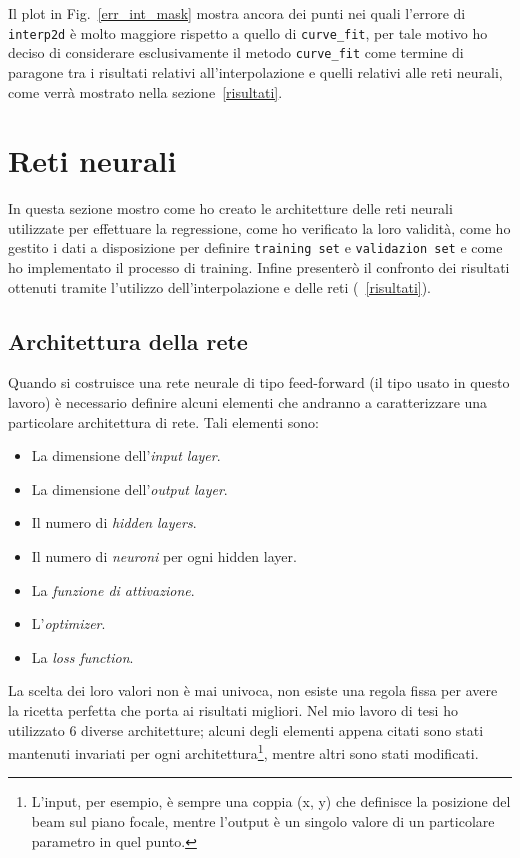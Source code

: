 \documentclass[12pt,a4paper,final]{book}
\begin{document}
Il plot in Fig.~\ref{err_int_mask} mostra ancora dei punti nei quali l'errore di \texttt{interp2d} è molto maggiore rispetto a quello di \texttt{curve\_fit}, per tale motivo ho deciso di considerare esclusivamente il metodo \texttt{curve\_fit} come termine di paragone tra i risultati relativi all'interpolazione e quelli relativi alle reti neurali, come verrà mostrato nella sezione~\ref{risultati}.

\newpage
\section{Reti neurali}\label{reti_neurali}
In questa sezione mostro come ho creato le architetture delle reti neurali utilizzate per effettuare la regressione, come ho verificato la loro validità, come ho gestito i dati a disposizione per definire \texttt{training set} e \texttt{validazion set} e come ho implementato il processo di training. Infine presenterò il confronto dei risultati ottenuti tramite l'utilizzo dell'interpolazione e delle reti (~\ref{risultati}).


\subsection{Architettura della rete}\label{architettura}
Quando si costruisce una rete neurale di tipo feed-forward (il tipo usato in questo lavoro) è necessario definire alcuni elementi che andranno a caratterizzare una particolare architettura di rete.
Tali elementi sono:
\begin{itemize}
	\item La dimensione dell'\textit{input layer}.
	\item La dimensione dell'\textit{output layer}.
	\item Il numero di \textit{hidden layers}.
	\item Il numero di \textit{neuroni} per ogni hidden layer.
	\item La \textit{funzione di attivazione}.
	\item L'\textit{optimizer}.
	\item La \textit{loss function}.
\end{itemize}
La scelta dei loro valori non è mai univoca, non esiste una regola fissa per avere la ricetta perfetta che porta ai risultati migliori.
Nel mio lavoro di tesi ho utilizzato 6 diverse architetture; alcuni degli elementi appena citati sono stati mantenuti invariati per ogni architettura\footnote{L'input, per esempio, è sempre una coppia (x, y) che definisce la posizione del beam sul piano focale, mentre l'output è un singolo valore di un particolare parametro in quel punto.}, mentre altri sono stati modificati.
\end{document}
